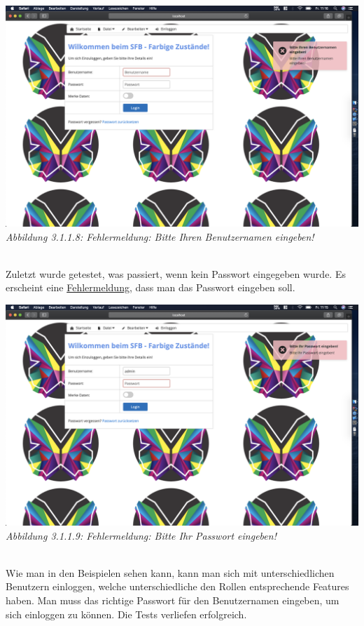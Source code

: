 \documentclass[enabledeprecatedfontcommands,fontsize=12pt,paper=a4,twoside]{scrartcl}
\begin{document}
\hypertarget{sc3.1.1.8}{
\includegraphics[width=1\textwidth]{Screenshots/311PasswordohneBenutzer.png}
\textit{Abbildung 3.1.1.8: Fehlermeldung: Bitte Ihren Benutzernamen eingeben!}
} \\

Zuletzt wurde getestet, was passiert, wenn kein Passwort eingegeben wurde. Es erscheint eine \hyperlink{sc3.1.1.9}{Fehlermeldung}, dass man das Passwort eingeben soll. 

\hypertarget{sc3.1.1.9}{
\includegraphics[width=1\textwidth]{Screenshots/311BittePasswordEingeben.png}
\textit{Abbildung 3.1.1.9: Fehlermeldung: Bitte Ihr Passwort eingeben!}
} \\

Wie man in den Beispielen sehen kann, kann man sich mit unterschiedlichen Benutzern einloggen, welche unterschiedliche den Rollen entsprechende Features haben. Man muss das richtige Passwort für den Benutzernamen eingeben, um sich einloggen zu können. Die Tests verliefen erfolgreich. \\ 
\end{document}
